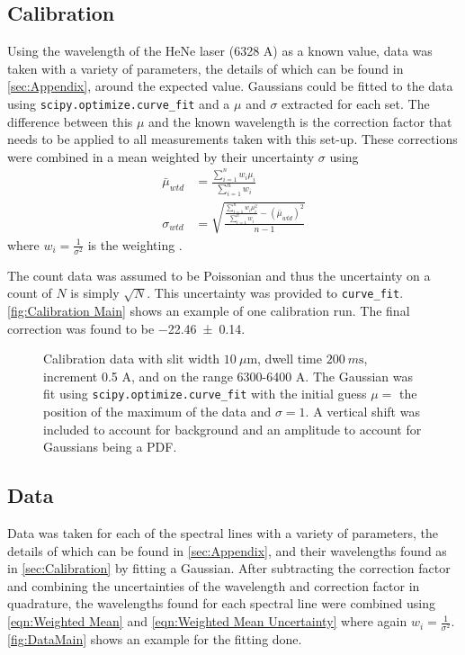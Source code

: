 \documentclass[11pt]{article}
\numberwithin{equation}{section}
\numberwithin{figure}{section}
\numberwithin{table}{section}
\begin{document}
\subsection{Calibration}\label{sec:Calibration}
\par Using the wavelength of the HeNe laser (6328 A) as a known value, data was taken with a variety of parameters, the details of which can be found in \autoref{sec:Appendix}, around the expected value. Gaussians could be fitted to the data using \texttt{scipy.optimize.curve\_fit} and a $\mu$ and $\sigma$ extracted for each set. The difference between this $\mu$ and the known wavelength is the correction factor that needs to be applied to all measurements taken with this set-up. These corrections were combined in a mean weighted by their uncertainty $\sigma$ using
\begin{align}
    \bar \mu_{wtd}&=\frac{\sum\limits_{i=1}^nw_i\mu_i}{\sum\limits_{i=1}^nw_i}\label{eqn:Weighted Mean}\\
    \sigma_{wtd}&=\sqrt{\frac{\frac{\sum\limits_{i=1}^nw_i\mu_i^2}{\sum\limits_{i=1}^nw_i}-(\bar\mu_{wtd})^2}{n-1}}\label{eqn:Weighted Mean Uncertainty}
\end{align}
where $w_i=\frac{1}{\sigma^2}$ is the weighting \cite{Data Reduction}. 
\par The count data was assumed to be Poissonian and thus the uncertainty on a count of $N$ is simply $\sqrt{N}$. This uncertainty was provided to \texttt{curve\_fit}. \autoref{fig:Calibration Main} shows an example of one calibration run. The final correction was found to be \num{-22.46\pm0.14}.

\begin{figure}[h]
    \begin{center}
       \caption{Calibration data with slit width $\SI{10}{\mu\m}$, dwell time $\SI{200}{m\second}$, increment 0.5 A, and on the range 6300-6400 A. The Gaussian was fit using \texttt{scipy.optimize.curve\_fit} with the initial guess $\mu=$ the position of the maximum of the data and $\sigma=1$. A vertical shift was included to account for background and an amplitude to account for Gaussians being a PDF.}
       \label{fig:Calibration Main}
    \end{center}
\end{figure}

\subsection{Data}\label{sec:Data}
\par Data was taken for each of the spectral lines with a variety of parameters, the details of which can be found in \autoref{sec:Appendix}, and their wavelengths found as in \autoref{sec:Calibration} by fitting a Gaussian. After subtracting the correction factor and combining the uncertainties of the wavelength and correction factor in quadrature, the wavelengths found for each spectral line were combined using \autoref{eqn:Weighted Mean} and \autoref{eqn:Weighted Mean Uncertainty} where again $w_i=\frac{1}{\sigma^2}$. \autoref{fig:DataMain} shows an example for the fitting done.
\end{document}
